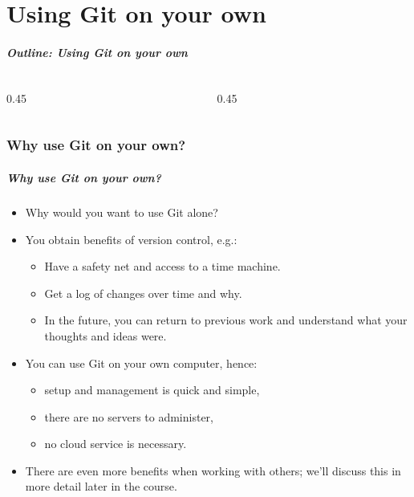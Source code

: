 \documentclass{git_course}
\begin{document}
\maketitle

\part{Using Git on your own}

\begin{frame}
    \partpage
\end{frame}

\begin{frame}
    \frametitle{Outline: Using Git on your own}
    \begin{columns}[T]
        \begin{column}{0.45\textwidth}
            \tableofcontents[
                currentsection, sectionstyle=show, hideallsubsections,
                sections={1-7}
            ]
        \end{column}
        \begin{column}{0.45\textwidth}
            \tableofcontents[
                currentsection, sectionstyle=show, hideallsubsections,
                sections={8-}
            ]
        \end{column}
    \end{columns}
\end{frame}

\section{Why use Git on your own?}

\begin{frame}
\frametitle{Why use Git on your own?}
\begin{itemize}
    \item Why would you want to use Git alone?
    \item You obtain benefits of version control, e.g.:
        \begin{itemize}
            \item Have a safety net and access to a time machine.
            \item Get a log of changes over time and why.
            \item In the future, you can return to previous work and
                understand what your thoughts and ideas were.
        \end{itemize}
    \item You can use Git on your own computer, hence:
        \begin{itemize}
            \item setup and management is quick and simple,
            \item there are no servers to administer,
            \item no cloud service is necessary.
        \end{itemize}
    \item There are even more benefits when working with others; we'll
        discuss this in more detail later in the course.
\end{itemize}
\end{frame}
\end{document}
